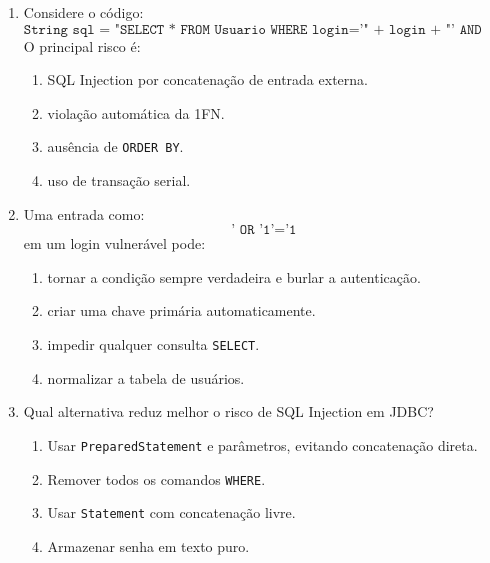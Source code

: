 \documentclass[12pt,a4paper]{article}
\begin{document}
\begin{enumerate}[resume,label=\textbf{Q\arabic*.}]
\begin{enumerate}[label=\alph*)]
    \item \texttt{executeUpdate()}.
    \item \texttt{executeQuery()} obrigatoriamente.
    \item \texttt{next()}.
    \item \texttt{getString()}.
\end{enumerate}

\item Considere o código:
\[
\texttt{String sql = "SELECT * FROM Usuario WHERE login='" + login + "' AND senha='" + senha + "'";}
\]
O principal risco é:

\begin{enumerate}[label=\alph*)]
    \item SQL Injection por concatenação de entrada externa.
    \item violação automática da 1FN.
    \item ausência de \texttt{ORDER BY}.
    \item uso de transação serial.
\end{enumerate}

\item Uma entrada como:
\[
\texttt{' OR '1'='1}
\]
em um login vulnerável pode:

\begin{enumerate}[label=\alph*)]
    \item tornar a condição sempre verdadeira e burlar a autenticação.
    \item criar uma chave primária automaticamente.
    \item impedir qualquer consulta \texttt{SELECT}.
    \item normalizar a tabela de usuários.
\end{enumerate}

\item Qual alternativa reduz melhor o risco de SQL Injection em JDBC?

\begin{enumerate}[label=\alph*)]
    \item Usar \texttt{PreparedStatement} e parâmetros, evitando concatenação direta.
    \item Remover todos os comandos \texttt{WHERE}.
    \item Usar \texttt{Statement} com concatenação livre.
    \item Armazenar senha em texto puro.
\end{enumerate}


\end{enumerate}
\end{document}
